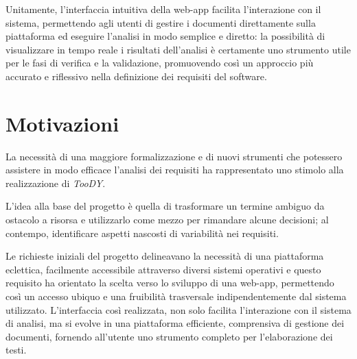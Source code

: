 \documentclass[12pt]{report}
\newcommand{\toody}{\textsl{TooDY}\xspace}
\newcommand{\flask}{\textsl{Flask}\xspace}
\begin{document}
Unitamente, l'interfaccia intuitiva della web-app facilita l'interazione con il sistema, permettendo agli utenti di gestire i documenti direttamente sulla piattaforma ed eseguire l'analisi in modo semplice e diretto: la possibilità di visualizzare in tempo reale i risultati dell'analisi è certamente uno strumento utile per le fasi di verifica e la validazione, promuovendo così un approccio più accurato e riflessivo nella definizione dei requisiti del software.



\section{Motivazioni}
La necessità di una maggiore formalizzazione e di nuovi strumenti che potessero assistere in modo efficace l'analisi dei requisiti ha rappresentato uno stimolo alla realizzazione di \toody.

L’idea alla base del progetto è quella di trasformare un termine ambiguo da ostacolo a risorsa e utilizzarlo come mezzo per rimandare alcune decisioni; al contempo, identificare aspetti nascosti di variabilità nei requisiti.

Le richieste iniziali del progetto delineavano la necessità di una piattaforma eclettica, facilmente accessibile attraverso diversi sistemi operativi e questo requisito ha orientato la scelta verso lo sviluppo di una web-app, permettendo così un accesso ubiquo e una fruibilità trasversale indipendentemente dal sistema utilizzato. L'interfaccia così realizzata, non solo facilita l'interazione con il sistema di analisi, ma si evolve in una piattaforma efficiente, comprensiva di gestione dei documenti, fornendo all'utente uno strumento completo per l'elaborazione dei testi.
\end{document}
